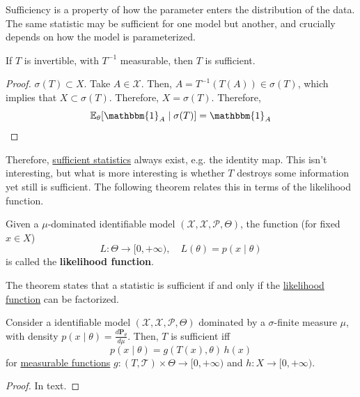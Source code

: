   Sufficiency is a property of how the parameter enters the distribution of the data. The same statistic may be sufficient for one model but another, and crucially depends on how the model is parameterized. 

  \begin{theorem}
    \label{thm:invertible-statistics-are-sufficient}
    If $T$ is invertible, with $T^{-1}$ measurable, then $T$ is sufficient. 
  \end{theorem}
  \begin{proof}
    $\sigma(T) \subset X$. Take $A \in \mathscr{X}$. Then, $A = T^{-1} (T(A)) \in \sigma(T)$, which implies that $X \subset \sigma(T)$. Therefore, $X = \sigma(T)$. Therefore, 
    \begin{equation}
      \mathbb{E}_{\theta} [\mathbbm{1}_A \mid \sigma(T)] = \mathbbm{1}_A
    \end{equation}
  \end{proof}

  Therefore, \hyperref[def:sufficient-statistic]{sufficient statistics} always exist, e.g. the identity map. This isn't interesting, but what is more interesting is whether $T$ destroys some information yet still is sufficient. The following theorem relates this in terms of the likelihood function. 

  \begin{definition}
    \label{def:likelihood-function}
    Given a $\mu$-dominated identifiable model $(\mathcal{X}, \mathscr{X}, \mathcal{P}, \Theta)$, the function (for fixed $x \in X$)
    \begin{equation}
      L: \Theta \to [0, +\infty), \quad L(\theta) = p(x \mid \theta) 
    \end{equation}
    is called the \textbf{likelihood function}. 
  \end{definition}

  The theorem states that a statistic is sufficient if and only if the \hyperref[def:likelihood-function]{likelihood function} can be factorized.  

  \begin{theorem}
    \label{thm:fisher-neyman-factorization}
 
    Consider a identifiable model $(\mathcal{X}, \mathscr{X}, \mathcal{P}, \Theta)$ dominated by a $\sigma$-finite measure $\mu$, with density $p(x \mid \theta) = \frac{d \mathbf{P}_\theta}{d \mu}$. Then, $T$ is sufficient iff 
    \begin{equation}
      p(x \mid \theta) = g(T(x), \theta) \, h(x)
    \end{equation}
    for \hyperref[mt-def:measurable-function]{measurable functions} $g: (T, \mathcal{T}) \times \Theta \to [0, +\infty)$ and $h: X \to [0, +\infty)$. 
  \end{theorem}
  \begin{proof}
    In text. 
  \end{proof}

